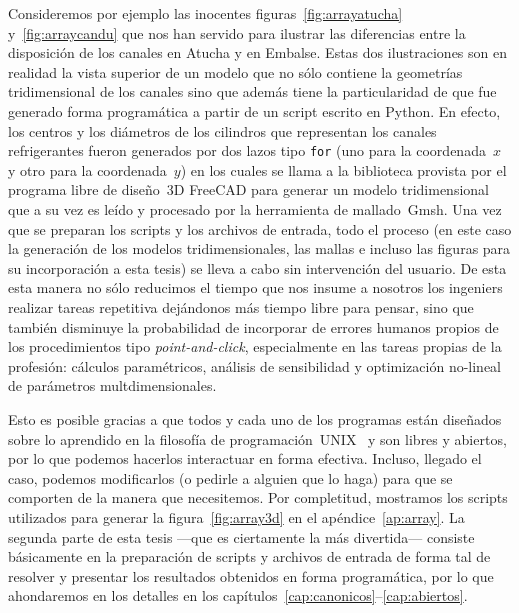 Consideremos por ejemplo las inocentes figuras~\ref{fig:arrayatucha} y~\ref{fig:arraycandu} que nos han servido para ilustrar las diferencias entre la disposición de los canales en Atucha y en Embalse. Estas dos ilustraciones son en realidad la vista superior de un modelo que no sólo contiene la geometrías tridimensional de los canales sino que además tiene la particularidad de que fue generado forma programática a partir de un script escrito en Python. En efecto, los centros y los diámetros de los cilindros que representan los canales refrigerantes fueron generados por dos lazos tipo \texttt{for} (uno para la coordenada~$x$ y otro para la coordenada~$y$) en los cuales se llama a la biblioteca provista por el programa libre de diseño~3D FreeCAD para generar un modelo tridimensional que a su vez es leído y procesado por la herramienta de mallado~Gmsh. Una vez que se preparan los scripts y los archivos de entrada, todo el proceso (en este caso la generación de los modelos tridimensionales, las mallas e incluso las figuras para su incorporación a esta tesis) se lleva a cabo sin intervención del usuario. De esta  esta manera no sólo reducimos el tiempo que nos insume a nosotros los ingeniers realizar tareas repetitiva dejándonos más tiempo libre para pensar, sino que también disminuye la probabilidad de incorporar de errores humanos propios de los procedimientos tipo \emph{point-and-click}, especialmente en las tareas propias de la profesión: cálculos paramétricos, análisis de sensibilidad y optimización no-lineal de parámetros multdimensionales.

Esto es posible gracias a que todos y cada uno de los programas están diseñados sobre lo aprendido en la filosofía de programación~UNIX~\cite{raymond} y son libres y abiertos, por lo que podemos hacerlos interactuar en forma efectiva. Incluso, llegado el caso, podemos modificarlos (o pedirle a alguien que lo haga) para que se comporten de la manera que necesitemos. Por completitud, mostramos los scripts utilizados para generar la figura~\ref{fig:array3d} en el apéndice~\ref{ap:array}. La segunda parte de esta tesis ---que es ciertamente la más divertida--- consiste básicamente en la preparación de scripts y archivos de entrada de forma tal de resolver y presentar los resultados obtenidos en forma programática, por lo que ahondaremos en los detalles en los capítulos~\ref{cap:canonicos}--\ref{cap:abiertos}.



\medskip



